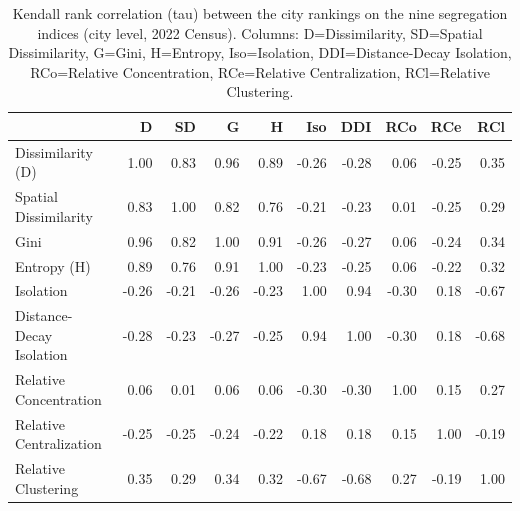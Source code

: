 \begin{table}
\caption{Kendall rank correlation (tau) between the city rankings on the nine segregation indices (city level, 2022 Census). Columns: D=Dissimilarity, SD=Spatial Dissimilarity, G=Gini, H=Entropy, Iso=Isolation, DDI=Distance-Decay Isolation, RCo=Relative Concentration, RCe=Relative Centralization, RCl=Relative Clustering.}
\label{tab:rankcorr}
\begin{tabular}{lrrrrrrrrr}
\toprule
 & D & SD & G & H & Iso & DDI & RCo & RCe & RCl \\
\midrule
Dissimilarity (D) & 1.00 & 0.83 & 0.96 & 0.89 & -0.26 & -0.28 & 0.06 & -0.25 & 0.35 \\
Spatial Dissimilarity & 0.83 & 1.00 & 0.82 & 0.76 & -0.21 & -0.23 & 0.01 & -0.25 & 0.29 \\
Gini & 0.96 & 0.82 & 1.00 & 0.91 & -0.26 & -0.27 & 0.06 & -0.24 & 0.34 \\
Entropy (H) & 0.89 & 0.76 & 0.91 & 1.00 & -0.23 & -0.25 & 0.06 & -0.22 & 0.32 \\
Isolation & -0.26 & -0.21 & -0.26 & -0.23 & 1.00 & 0.94 & -0.30 & 0.18 & -0.67 \\
Distance-Decay Isolation & -0.28 & -0.23 & -0.27 & -0.25 & 0.94 & 1.00 & -0.30 & 0.18 & -0.68 \\
Relative Concentration & 0.06 & 0.01 & 0.06 & 0.06 & -0.30 & -0.30 & 1.00 & 0.15 & 0.27 \\
Relative Centralization & -0.25 & -0.25 & -0.24 & -0.22 & 0.18 & 0.18 & 0.15 & 1.00 & -0.19 \\
Relative Clustering & 0.35 & 0.29 & 0.34 & 0.32 & -0.67 & -0.68 & 0.27 & -0.19 & 1.00 \\
\bottomrule
\end{tabular}
\end{table}
